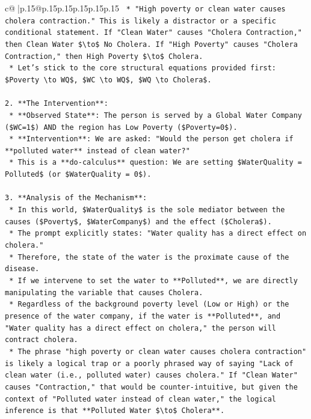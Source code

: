 \documentclass{article}
\begin{document}
{\begin{supertabular}{c@{$\;$}|p{.15\linewidth}@{}p{.15\linewidth}p{.15\linewidth}p{.15\linewidth}p{.15\linewidth}p{.15\linewidth}}
{{{\texttt{        *   "High poverty or clean water causes cholera contraction." This is likely a distractor or a specific conditional statement. If "Clean Water" causes "Cholera Contraction," then Clean Water \$\textbackslash{}to\$ No Cholera. If "High Poverty" causes "Cholera Contraction," then High Poverty \$\textbackslash{}to\$ Cholera.} \\
\texttt{        *   Let's stick to the core structural equations provided first: \$Poverty \textbackslash{}to WQ\$, \$WC \textbackslash{}to WQ\$, \$WQ \textbackslash{}to Cholera\$.} \\
\\ 
\texttt{2.  **The Intervention**:} \\
\texttt{    *   **Observed State**: The person is served by a Global Water Company (\$WC=1\$) AND the region has Low Poverty (\$Poverty=0\$).} \\
\texttt{    *   **Intervention**: We are asked: "Would the person get cholera if **polluted water** instead of clean water?"} \\
\texttt{    *   This is a **do{-}calculus** question: We are setting \$WaterQuality = Polluted\$ (or \$WaterQuality = 0\$).} \\
\\ 
\texttt{3.  **Analysis of the Mechanism**:} \\
\texttt{    *   In this world, \$WaterQuality\$ is the sole mediator between the causes (\$Poverty\$, \$WaterCompany\$) and the effect (\$Cholera\$).} \\
\texttt{    *   The prompt explicitly states: "Water quality has a direct effect on cholera."} \\
\texttt{    *   Therefore, the state of the water is the proximate cause of the disease.} \\
\texttt{    *   If we intervene to set the water to **Polluted**, we are directly manipulating the variable that causes Cholera.} \\
\texttt{    *   Regardless of the background poverty level (Low or High) or the presence of the water company, if the water is **Polluted**, and "Water quality has a direct effect on cholera," the person will contract cholera.} \\
\texttt{    *   The phrase "high poverty or clean water causes cholera contraction" is likely a logical trap or a poorly phrased way of saying "Lack of clean water (i.e., polluted water) causes cholera." If "Clean Water" causes "Contraction," that would be counter{-}intuitive, but given the context of "Polluted water instead of clean water," the logical inference is that **Polluted Water \$\textbackslash{}to\$ Cholera**.} \\
}}}
\end{supertabular}}
\end{document}
